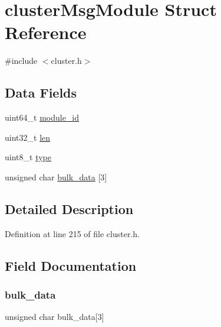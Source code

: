 \hypertarget{structcluster_msg_module}{}\section{cluster\+Msg\+Module Struct Reference}
\label{structcluster_msg_module}


{\ttfamily \#include $<$cluster.\+h$>$}

\subsection*{Data Fields}
\begin{DoxyCompactItemize}
\item 
uint64\+\_\+t \hyperlink{structcluster_msg_module_a5c568ad76933cdbb1f61b40781917492}{module\+\_\+id}
\item 
uint32\+\_\+t \hyperlink{structcluster_msg_module_a96bbf959016e4411c9e6b9812a8be60a}{len}
\item 
uint8\+\_\+t \hyperlink{structcluster_msg_module_a1d127017fb298b889f4ba24752d08b8e}{type}
\item 
unsigned char \hyperlink{structcluster_msg_module_a2e2032a99c30443d5fe71db1bb696f94}{bulk\+\_\+data} \mbox{[}3\mbox{]}
\end{DoxyCompactItemize}


\subsection{Detailed Description}


Definition at line 215 of file cluster.\+h.



\subsection{Field Documentation}
\mbox{\label{structcluster_msg_module_a2e2032a99c30443d5fe71db1bb696f94}} 
\subsubsection{\texorpdfstring{bulk\+\_\+data}{bulk\_data}}
{\footnotesize\ttfamily unsigned char bulk\+\_\+data\mbox{[}3\mbox{]}}



